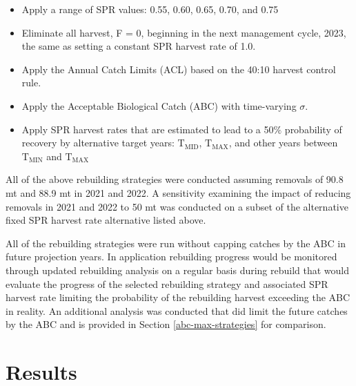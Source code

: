 \documentclass[11pt,
  english,
  a4paper,
]{article}
\begin{document}
\leavevmode\tagmcend\tagstructend\par

\begin{itemize}
    \item Apply a range of SPR values: 0.55, 0.60, 0.65, 0.70, and 0.75 
    \item Eliminate all harvest, F = 0, beginning in the next management cycle, 2023, the same as setting a constant SPR harvest rate of 1.0.
    \item Apply the Annual Catch Limits (ACL) based on the 40:10 harvest control rule.
    \item Apply the Acceptable Biological Catch (ABC) with time-varying $\sigma$.
    \item Apply SPR harvest rates that are estimated to lead to a 50$\%$ probability of recovery by alternative target years: $\text{T}_\text{MID}$, $\text{T}_\text{MAX}$, and other years between $\text{T}_\text{MIN}$ and $\text{T}_\text{MAX}$
\end{itemize}


All of the above rebuilding strategies were conducted assuming removals of 90.8 mt and 88.9 mt in 2021 and 2022. A sensitivity examining the impact of reducing removals in 2021 and 2022 to 50 mt was conducted on a subset of the alternative fixed SPR harvest rate alternative listed above.

\leavevmode\tagmcend\tagstructend\par


All of the rebuilding strategies were run without capping catches by the ABC in future projection years. In application rebuilding progress would be monitored through updated rebuilding analysis on a regular basis during rebuild that would evaluate the progress of the selected rebuilding strategy and associated SPR harvest rate limiting the probability of the rebuilding harvest exceeding the ABC in reality. An additional analysis was conducted that did limit the future catches by the ABC and is provided in Section \ref{abc-max-strategies} for comparison.

\leavevmode\tagmcend\tagstructend\par


\hypertarget{results}{%
\section{Results}\label{results}}
\end{document}
